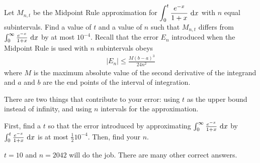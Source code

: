 
\begin{question}[M121 2001A]
Let $M_{n,t}$ be the Midpoint Rule approximation for
$\displaystyle\int_0^t \frac{e^{-x}}{1+x}\ \dee{x}$ with $n$ equal subintervals.
Find a value of $t$ and a value of $n$ such that $M_{n,t}$ differs
from  $\int_0^\infty \frac{e^{-x}}{1+x}\ \mathrm{d}x$ by at most $10^{-4}$.
Recall that the error $E_n$ introduced when the Midpoint
Rule is used with $n$ subintervals obeys
\begin{align*}
|E_n|\le \frac{M(b-a)^3}{24n^2}
\end{align*}
where $M$ is the maximum absolute value of the second derivative of the
integrand and $a$ and $b$ are the end points of the interval of integration.
\end{question}

\begin{hint}
There are two things that contribute to your error: using $t$ as the upper bound instead of infinity, and using $n$ intervals for the approximation.

First, find a $t$ so that the error introduced by approximating
$\int_0^\infty \frac{e^{-x}}{1+x}\ \mathrm{d}x$ by $\int_0^t \frac{e^{-x}}{1+x}\ \dee{x}$
is at most $\frac{1}{2} 10^{-4}$. Then, find your $n$.
\end{hint}

\begin{answer}
$t=10$ and $n= 2042$ will do the job.
There are many other correct answers.
\end{answer}

